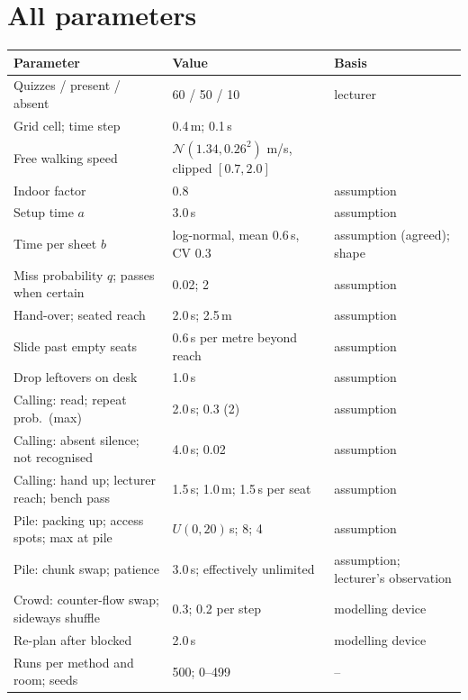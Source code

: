 \documentclass[11pt,a4paper]{article}
\begin{document}
\section{All parameters}
\begin{table}[htbp]\centering\small
\begin{tabularx}{\textwidth}{lXl}
\toprule
Parameter & Value & Basis \\
\midrule
Quizzes / present / absent & 60 / 50 / 10 & lecturer \\
Grid cell; time step & 0.4\,m; 0.1\,s & \cite{burstedde2001} \\
Free walking speed & $\mathcal N(1.34, 0.26^2)$ m/s, clipped $[0.7, 2.0]$ & \cite{weidmann1993} \\
Indoor factor & 0.8 & assumption \\
Setup time $a$ & 3.0\,s & assumption \\
Time per sheet $b$ & log-normal, mean 0.6\,s, CV 0.3 & assumption (agreed); shape \cite{luce1986} \\
Miss probability $q$; passes when certain & 0.02; 2 & assumption \\
Hand-over; seated reach & 2.0\,s; 2.5\,m & assumption \\
Slide past empty seats & 0.6\,s per metre beyond reach & assumption \\
Drop leftovers on desk & 1.0\,s & assumption \\
Calling: read; repeat prob.\ (max) & 2.0\,s; 0.3 (2) & assumption \\
Calling: absent silence; not recognised & 4.0\,s; 0.02 & assumption \\
Calling: hand up; lecturer reach; bench pass & 1.5\,s; 1.0\,m; 1.5\,s per seat & assumption \\
Pile: packing up; access spots; max at pile & $U(0,20)$\,s; 8; 4 & assumption \\
Pile: chunk swap; patience & 3.0\,s; effectively unlimited & assumption; lecturer's observation \\
Crowd: counter-flow swap; sideways shuffle & 0.3; 0.2 per step & modelling device \\
Re-plan after blocked & 2.0\,s & modelling device \\
Runs per method and room; seeds & 500; 0--499 & -- \\
\bottomrule
\end{tabularx}
\end{table}
\end{document}
